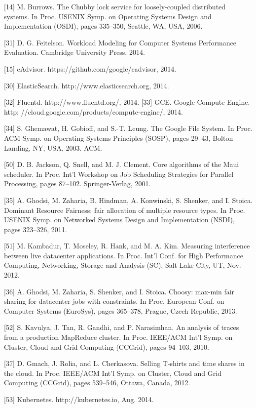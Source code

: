 [14] M. Burrows. The Chubby lock service for loosely-coupled
distributed systems. In Proc. USENIX Symp. on Operating
Systems Design and Implementation (OSDI), pages 335–350,
Seattle, WA, USA, 2006.

[31] D. G. Feitelson. Workload Modeling for Computer Systems
Performance Evaluation. Cambridge University Press, 2014.

[15] cAdvisor. https://github.com/google/cadvisor,
2014.

[30] ElasticSearch. http://www.elasticsearch.org, 2014.

[32] Fluentd. http://www.fluentd.org/, 2014.
[33] GCE. Google Compute Engine. http:
//cloud.google.com/products/compute-engine/,
2014.


[34] S. Ghemawat, H. Gobioff, and S.-T. Leung. The Google File
System. In Proc. ACM Symp. on Operating Systems
Principles (SOSP), pages 29–43, Bolton Landing, NY, USA,
2003. ACM.

[50] D. B. Jackson, Q. Snell, and M. J. Clement. Core algorithms
of the Maui scheduler. In Proc. Int’l Workshop on Job
Scheduling Strategies for Parallel Processing, pages 87–102.
Springer-Verlag, 2001.

[35] A. Ghodsi, M. Zaharia, B. Hindman, A. Konwinski,
S. Shenker, and I. Stoica. Dominant Resource Fairness: fair
allocation of multiple resource types. In Proc. USENIX
Symp. on Networked Systems Design and Implementation
(NSDI), pages 323–326, 2011.

[51] M. Kambadur, T. Moseley, R. Hank, and M. A. Kim.
Measuring interference between live datacenter applications.
In Proc. Int’l Conf. for High Performance Computing,
Networking, Storage and Analysis (SC), Salt Lake City, UT,
Nov. 2012.

[36] A. Ghodsi, M. Zaharia, S. Shenker, and I. Stoica. Choosy:
max-min fair sharing for datacenter jobs with constraints. In
Proc. European Conf. on Computer Systems (EuroSys), pages
365–378, Prague, Czech Republic, 2013.

[52] S. Kavulya, J. Tan, R. Gandhi, and P. Narasimhan. An
analysis of traces from a production MapReduce cluster. In
Proc. IEEE/ACM Int’l Symp. on Cluster, Cloud and Grid
Computing (CCGrid), pages 94–103, 2010.

[37] D. Gmach, J. Rolia, and L. Cherkasova. Selling T-shirts and
time shares in the cloud. In Proc. IEEE/ACM Int’l Symp. on
Cluster, Cloud and Grid Computing (CCGrid), pages
539–546, Ottawa, Canada, 2012.

[53] Kubernetes. http://kubernetes.io, Aug. 2014.

